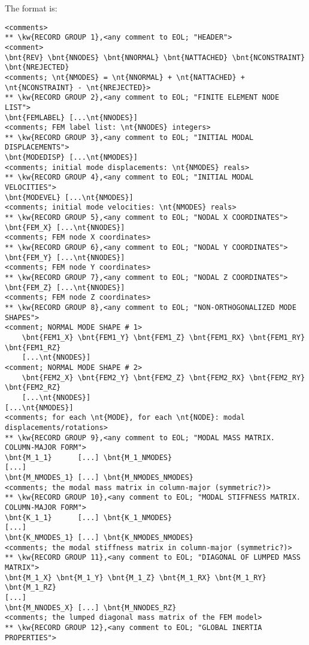 The format is:
{\small
\begin{Verbatim}[commandchars=\\\{\}]
<comments>
** \kw{RECORD GROUP 1},<any comment to EOL; "HEADER">
<comment>
\bnt{REV} \bnt{NNODES} \bnt{NNORMAL} \bnt{NATTACHED} \bnt{NCONSTRAINT} \bnt{NREJECTED}
<comments; \nt{NMODES} = \nt{NNORMAL} + \nt{NATTACHED} + \nt{NCONSTRAINT} - \nt{NREJECTED}>
** \kw{RECORD GROUP 2},<any comment to EOL; "FINITE ELEMENT NODE LIST">
\bnt{FEMLABEL} [...\nt{NNODES}]
<comments; FEM label list: \nt{NNODES} integers>
** \kw{RECORD GROUP 3},<any comment to EOL; "INITIAL MODAL DISPLACEMENTS">
\bnt{MODEDISP} [...\nt{NMODES}]
<comments; initial mode displacements: \nt{NMODES} reals>
** \kw{RECORD GROUP 4},<any comment to EOL; "INITIAL MODAL VELOCITIES">
\bnt{MODEVEL} [...\nt{NMODES}]
<comments; initial mode velocities: \nt{NMODES} reals>
** \kw{RECORD GROUP 5},<any comment to EOL; "NODAL X COORDINATES">
\bnt{FEM_X} [...\nt{NNODES}]
<comments; FEM node X coordinates>
** \kw{RECORD GROUP 6},<any comment to EOL; "NODAL Y COORDINATES">
\bnt{FEM_Y} [...\nt{NNODES}]
<comments; FEM node Y coordinates>
** \kw{RECORD GROUP 7},<any comment to EOL; "NODAL Z COORDINATES">
\bnt{FEM_Z} [...\nt{NNODES}]
<comments; FEM node Z coordinates>
** \kw{RECORD GROUP 8},<any comment to EOL; "NON-ORTHOGONALIZED MODE SHAPES">
<comment; NORMAL MODE SHAPE # 1>
    \bnt{FEM1_X} \bnt{FEM1_Y} \bnt{FEM1_Z} \bnt{FEM1_RX} \bnt{FEM1_RY} \bnt{FEM1_RZ}
    [...\nt{NNODES}]
<comment; NORMAL MODE SHAPE # 2>
    \bnt{FEM2_X} \bnt{FEM2_Y} \bnt{FEM2_Z} \bnt{FEM2_RX} \bnt{FEM2_RY} \bnt{FEM2_RZ}
    [...\nt{NNODES}]
[...\nt{NMODES}]
<comments; for each \nt{MODE}, for each \nt{NODE}: modal displacements/rotations>
** \kw{RECORD GROUP 9},<any comment to EOL; "MODAL MASS MATRIX. COLUMN-MAJOR FORM">
\bnt{M_1_1}      [...] \bnt{M_1_NMODES}
[...]
\bnt{M_NMODES_1} [...] \bnt{M_NMODES_NMODES}
<comments; the modal mass matrix in column-major (symmetric?)>
** \kw{RECORD GROUP 10},<any comment to EOL; "MODAL STIFFNESS MATRIX. COLUMN-MAJOR FORM">
\bnt{K_1_1}      [...] \bnt{K_1_NMODES}
[...]
\bnt{K_NMODES_1} [...] \bnt{K_NMODES_NMODES}
<comments; the modal stiffness matrix in column-major (symmetric?)>
** \kw{RECORD GROUP 11},<any comment to EOL; "DIAGONAL OF LUMPED MASS MATRIX">
\bnt{M_1_X} \bnt{M_1_Y} \bnt{M_1_Z} \bnt{M_1_RX} \bnt{M_1_RY} \bnt{M_1_RZ}
[...]
\bnt{M_NNODES_X} [...] \bnt{M_NNODES_RZ}
<comments; the lumped diagonal mass matrix of the FEM model>
** \kw{RECORD GROUP 12},<any comment to EOL; "GLOBAL INERTIA PROPERTIES">

\end{Verbatim}}
